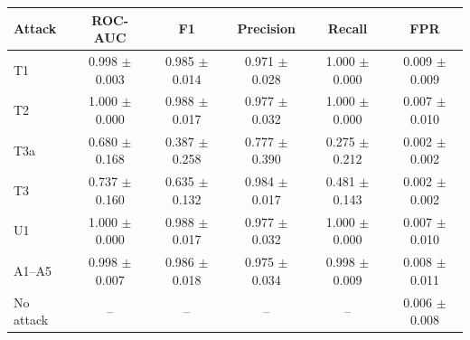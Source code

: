 \begin{tabular}{lccccc}
\hline
Attack & ROC-AUC & F1 & Precision & Recall & FPR \\
\hline
T1 & 0.998 $\pm$ 0.003 & 0.985 $\pm$ 0.014 & 0.971 $\pm$ 0.028 & 1.000 $\pm$ 0.000 & 0.009 $\pm$ 0.009 \\
T2 & 1.000 $\pm$ 0.000 & 0.988 $\pm$ 0.017 & 0.977 $\pm$ 0.032 & 1.000 $\pm$ 0.000 & 0.007 $\pm$ 0.010 \\
T3a & 0.680 $\pm$ 0.168 & 0.387 $\pm$ 0.258 & 0.777 $\pm$ 0.390 & 0.275 $\pm$ 0.212 & 0.002 $\pm$ 0.002 \\
T3 & 0.737 $\pm$ 0.160 & 0.635 $\pm$ 0.132 & 0.984 $\pm$ 0.017 & 0.481 $\pm$ 0.143 & 0.002 $\pm$ 0.002 \\
U1 & 1.000 $\pm$ 0.000 & 0.988 $\pm$ 0.017 & 0.977 $\pm$ 0.032 & 1.000 $\pm$ 0.000 & 0.007 $\pm$ 0.010 \\
A1–A5 & 0.998 $\pm$ 0.007 & 0.986 $\pm$ 0.018 & 0.975 $\pm$ 0.034 & 0.998 $\pm$ 0.009 & 0.008 $\pm$ 0.011 \\
No attack & -- & -- & -- & -- & 0.006 $\pm$ 0.008 \\
\hline
\end{tabular}
